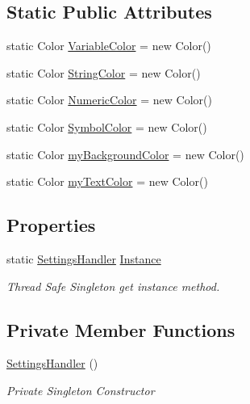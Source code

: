 \subsection*{Static Public Attributes}
\begin{DoxyCompactItemize}
\item 
static Color \mbox{\hyperlink{class_cert_complete_1_1_settings_handler_acd9d54256533190c9ae926ff60080143}{Variable\+Color}} = new Color()
\item 
static Color \mbox{\hyperlink{class_cert_complete_1_1_settings_handler_addc82d6a53e205bc5c9796a0a24dab04}{String\+Color}} = new Color()
\item 
static Color \mbox{\hyperlink{class_cert_complete_1_1_settings_handler_a458905c32f7f64339f6f675bbb13822e}{Numeric\+Color}} = new Color()
\item 
static Color \mbox{\hyperlink{class_cert_complete_1_1_settings_handler_a53a9339ae79b6aec5f6bb9daddf16c60}{Symbol\+Color}} = new Color()
\item 
static Color \mbox{\hyperlink{class_cert_complete_1_1_settings_handler_aee0063e49037dee79caca19d8b22630a}{my\+Background\+Color}} = new Color()
\item 
static Color \mbox{\hyperlink{class_cert_complete_1_1_settings_handler_a6e3da08cd3172bf19356ebed6bcb99fa}{my\+Text\+Color}} = new Color()
\end{DoxyCompactItemize}
\subsection*{Properties}
\begin{DoxyCompactItemize}
\item 
static \mbox{\hyperlink{class_cert_complete_1_1_settings_handler}{Settings\+Handler}} \mbox{\hyperlink{class_cert_complete_1_1_settings_handler_a7c4f8eb33b1113986d52942f93e52da8}{Instance}}
\begin{DoxyCompactList}\small\item\em Thread Safe Singleton get instance method. \end{DoxyCompactList}\end{DoxyCompactItemize}
\subsection*{Private Member Functions}
\begin{DoxyCompactItemize}
\item 
\mbox{\hyperlink{class_cert_complete_1_1_settings_handler_a9bf5be6fa3187631488a9ffa46fc4b7f}{Settings\+Handler}} ()
\begin{DoxyCompactList}\small\item\em Private Singleton Constructor \end{DoxyCompactList}\end{DoxyCompactItemize}
